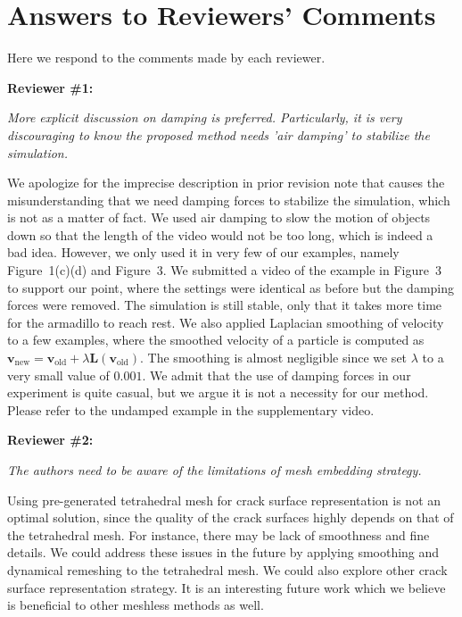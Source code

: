 \section{Answers to Reviewers' Comments}

Here we respond to the comments made by each reviewer.

\noindent{}\textbf{Reviewer \#1:}

\emph{More explicit discussion on damping is preferred. Particularly, it is very discouraging to know the proposed method needs 'air damping' to stabilize the simulation.}

We apologize for the imprecise description in prior revision note that causes the misunderstanding that we need damping forces to stabilize the simulation, which is not as a matter of fact. We used air damping to slow the motion of objects down so that the length of the video would not be too long, which is indeed a bad idea. However, we only used it in very few of our examples, namely Figure~1(c)(d) and Figure~3. We submitted a video of the example in Figure~3 to support our point, where the settings were identical as before but the damping forces were removed. The simulation is still stable, only that it takes more time for the armadillo to reach rest. We also applied Laplacian smoothing of velocity to a few examples, where the smoothed velocity of a particle is computed as $\mathbf{v}_{\mathrm{new}}=\mathbf{v}_{\mathrm{old}}+\lambda \mathbf{L}(\mathbf{v}_{\mathrm{old}})$. The smoothing is almost negligible since we set $\lambda$ to a very small value of $0.001$. We admit that the use of damping forces in our experiment is quite casual, but we argue it is not a necessity for our method. Please refer to the undamped example in the supplementary video.

\noindent{}\textbf{Reviewer \#2:}

\emph{The authors need to be aware of the limitations of mesh embedding strategy.}

Using pre-generated tetrahedral mesh for crack surface representation is not an optimal solution, since the quality of the crack surfaces highly depends on that of the tetrahedral mesh. For instance, there may be lack of smoothness and fine details. We could address these issues in the future by applying smoothing and dynamical remeshing to the tetrahedral mesh. We could also explore other crack surface representation strategy. It is an interesting future work which we believe is beneficial to other meshless methods as well.

